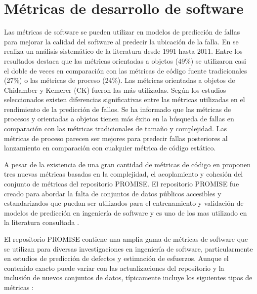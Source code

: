 \section{Métricas de desarrollo de software}

Las métricas de software se pueden utilizar en modelos de predicción de fallas para mejorar la calidad del software al predecir la ubicación de la falla. En \cite{RADJENOVIC20131397} se realiza un análisis sistemático de la literatura desde 1991 hasta 2011. Entre los resultados destaca que las métricas orientadas a objetos (49\%) se utilizaron casi el doble de veces en comparación con las métricas de código fuente tradicionales (27\%) o las métricas de proceso (24\%). Las métricas orientadas a objetos de Chidamber y Kemerer (CK) fueron las más utilizadas. Según los estudios seleccionados existen diferencias significativas entre las métricas utilizadas en el rendimiento de la predicción de fallos. Se ha informado que las métricas de procesos y orientadas a objetos tienen más éxito en la búsqueda de fallas en comparación con las métricas tradicionales de tamaño y complejidad. Las métricas de proceso parecen ser mejores para predecir fallas posteriores al lanzamiento en comparación con cualquier métrica de código estático.

A pesar de la existencia de una gran cantidad de métricas de código en \cite{singh2024improved} proponen tres nuevas métricas basadas en la complejidad, el acoplamiento y cohesión del conjunto de métricas del repositorio PROMISE. El repositorio PROMISE fue creado para abordar la falta de conjuntos de datos públicos accesibles y estandarizados que puedan ser utilizados para el entrenamiento \cite{Sayyad-Shirabad+Menzies:2005} y validación de modelos de predicción en ingeniería de software y es uno de los mas utilizado en la literatura consultada \cite{ARAR2016106,rathi_empirical_2023,sharma2023far,NEVENDRA2022116217,PANDEY2020113085,rathore2021software}.

El repositorio PROMISE contiene una amplia gama de métricas de software que se utilizan para diversas investigaciones en ingeniería de software, particularmente en estudios de predicción de defectos y estimación de esfuerzos. Aunque el contenido exacto puede variar con las actualizaciones del repositorio y la inclusión de nuevos conjuntos de datos, típicamente incluye los siguientes tipos de métricas \cite{singh2024improved}:

